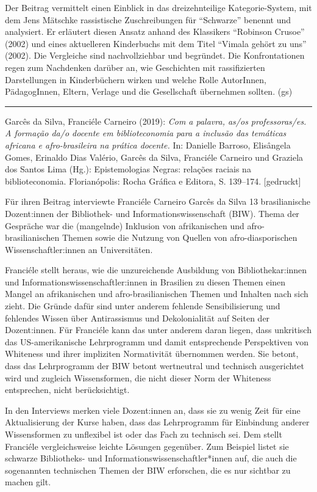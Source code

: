 \documentclass[a4paper,
fontsize=11pt,
oneside,
numbers=noperiodatend,
parskip=half-,
bibliography=totoc,
final
]{scrartcl}
\begin{document}
Der Beitrag vermittelt einen Einblick in das dreizehnteilige
Kategorie-System, mit dem Jens Mätschke rassistische Zuschreibungen für
\enquote{Schwarze} benennt und analysiert. Er erläutert diesen Ansatz
anhand des Klassikers \enquote{Robinson Crusoe} (2002) und eines
aktuelleren Kinderbuchs mit dem Titel \enquote{Vimala gehört zu uns}
(2002). Die Vergleiche sind nachvollziehbar und begründet. Die
Konfrontationen regen zum Nachdenken darüber an, wie Geschichten mit
rassifizierten Darstellungen in Kinderbüchern wirken und welche Rolle
AutorInnen, PädagogInnen, Eltern, Verlage und die Gesellschaft
übernehmen sollten. (gs)

\begin{center}\rule{0.5\linewidth}{0.5pt}\end{center}

Garcês da Silva, Franciéle Carneiro (2019): \emph{Com a palavra, as/os
professoras/es. A formação da/o docente em biblioteconomia para a
inclusão das temáticas africana e afro-brasileira na prática docente.}
In: Danielle Barroso, Elisângela Gomes, Erinaldo Dias Valério, Garcês da
Silva, Franciéle Carneiro und Graziela dos Santos Lima (Hg.):
Epistemologias Negras: relações raciais na biblioteconomia.
Florianópolis: Rocha Gráfica e Editora, S. 139--174. {[}gedruckt{]}

Für ihren Beitrag interviewte Franciéle Carneiro Garcês da Silva 13
brasilianische Dozent:innen der Bibliothek- und Informationswissenschaft
(BIW). Thema der Gespräche war die (mangelnde) Inklusion von
afrikanischen und afro-brasilianischen Themen sowie die Nutzung von
Quellen von afro-diasporischen Wissenschaftler:innen an Universitäten.

Franciéle stellt heraus, wie die unzureichende Ausbildung von
Bibliothekar:innen und Informationswissenschaftler:innen in Brasilien zu
diesen Themen einen Mangel an afrikanischen und afro-brasilianischen
Themen und Inhalten nach sich zieht. Die Gründe dafür sind unter anderem
fehlende Sensibilisierung und fehlendes Wissen über Antirassismus und
Dekolonialität auf Seiten der Dozent:innen. Für Franciéle kann das unter
anderem daran liegen, dass unkritisch das US-amerikanische Lehrprogramm
und damit entsprechende Perspektiven von Whiteness und ihrer impliziten
Normativität übernommen werden. Sie betont, dass das Lehrprogramm der
BIW betont wertneutral und technisch ausgerichtet wird und zugleich
Wissensformen, die nicht dieser Norm der Whiteness entsprechen, nicht
berücksichtigt.

In den Interviews merken viele Dozent:innen an, dass sie zu wenig Zeit
für eine Aktualisierung der Kurse haben, dass das Lehrprogramm für
Einbindung anderer Wissensformen zu unflexibel ist oder das Fach zu
technisch sei. Dem stellt Franciéle vergleichsweise leichte Lösungen
gegenüber. Zum Beispiel listet sie schwarze Bibliotheks- und
Informationswissenschaftler*innen auf, die auch die sogenannten
technischen Themen der BIW erforschen, die es nur sichtbar zu machen
gilt.
\end{document}
